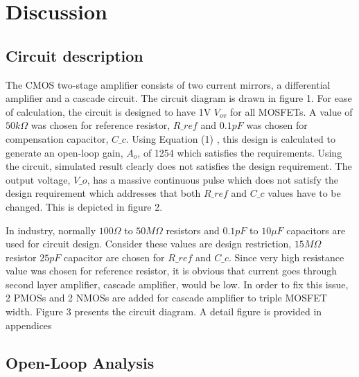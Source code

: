 \documentclass[conference,compsoc]{IEEEtran}
\begin{document}
\section{Discussion}
\subsection{Circuit description}
The CMOS two-stage amplifier consists of two current
mirrors, a differential amplifier and a cascade circuit. The circuit diagram is drawn in figure 1. For ease of calculation, the circuit is designed to have 1V \(V_{ov}\) for all MOSFETs.  A value of \(50 k\Omega\) was chosen for reference resistor, \(R\_ref\) and \(0.1 pF\) was chosen for compensation capacitor, \(C\_c\). Using Equation (1) , this design is calculated to generate an open-loop gain, \(A_o\), of 1254 which satisfies the requirements. Using the circuit, simulated result clearly does not satisfies the design requirement. The output voltage, \(V\_o\), has a massive continuous pulse which does not satisfy the design requirement which addresses that both \(R\_ref\) and \(C\_c\) values have to be changed. This is depicted in figure 2.

In industry, normally \(100\Omega\) to \(50M\Omega\) resistors and \(0.1pF\) to \(10\mu F\) capacitors are used for circuit design. Consider these values are design restriction, \(15M\Omega\) resistor \(25pF\) capacitor are chosen for \(R\_ref\) and \(C\_c\). Since very high resistance value was chosen for reference resistor, it is obvious that current goes through second layer amplifier, cascade amplifier, would be low. In order to fix this issue, 2 PMOSs and 2 NMOSs are added for cascade amplifier to triple MOSFET width. Figure 3 presents the circuit diagram. A detail figure is provided in appendices\\


\subsection{Open-Loop Analysis}
\end{document}
